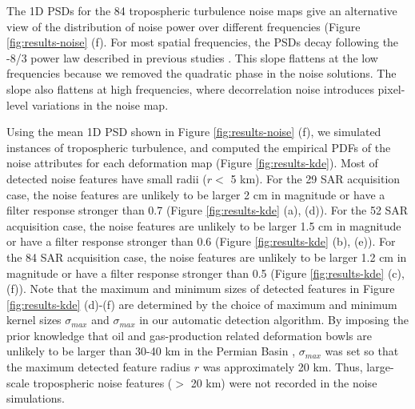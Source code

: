 	The 1D PSDs for the 84 tropospheric turbulence noise maps give an alternative view of the distribution of noise power over different frequencies (Figure \ref{fig:results-noise} (f). For most spatial frequencies, the PSDs decay following the -8/3 power law described in previous studies \cite{Hanssen2001RadarInterferometryData, Onn2006ModelingWaterVapor}. This slope flattens at the low frequencies because we removed the quadratic phase in the noise solutions. The slope also flattens at high frequencies, where decorrelation noise introduces pixel-level variations in the noise map.
	
	
	Using the mean 1D PSD shown in Figure \ref{fig:results-noise} (f), we simulated instances of tropospheric turbulence, and computed the empirical PDFs of the noise attributes for each deformation map (Figure \ref{fig:results-kde}).  Most of detected noise features have small radii ($r <$ 5 km). For the 29 SAR acquisition case, the noise features are unlikely to be larger 2 cm in magnitude or have a filter response stronger than 0.7 (Figure \ref{fig:results-kde} (a), (d)). For the 52 SAR acquisition case, the noise features are unlikely to be larger 1.5 cm in magnitude or have a filter response stronger than 0.6 (Figure \ref{fig:results-kde} (b), (e)). For the 84 SAR acquisition case, the noise features are unlikely to be larger 1.2 cm in magnitude or have a filter response stronger than 0.5 (Figure \ref{fig:results-kde} (c), (f)).
	Note that the maximum and minimum sizes of detected features in Figure \ref{fig:results-kde} (d)-(f) are determined by the choice of maximum and minimum kernel sizes $\sigma_{max}$ and $\sigma_{max}$ in our automatic detection algorithm. By imposing the prior knowledge that oil and gas-production related deformation bowls are unlikely to be larger than 30-40 km in the Permian Basin \cite{Staniewicz2020InsarRevealsComplex}, $\sigma_{max}$ was set so that the maximum detected feature radius $r$ was approximately 20 km. Thus, large-scale tropospheric noise features ($>$ 20 km) were not recorded in the noise simulations.
	
